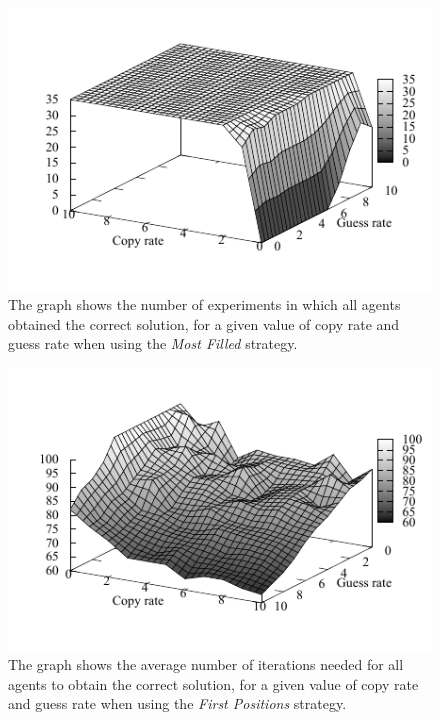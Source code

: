 \documentclass{article}
\begin{document}
\begin{figure}
\includegraphics[scale=1]{ijcai_sudoku/fill_suc}
\caption{The graph shows the number of experiments in which all agents obtained the correct solution, for a given value of copy rate and guess rate when using the \emph{Most Filled} strategy.
}
\label{fig:fill_suc}
\end{figure}

\begin{figure}
\includegraphics[scale=1]{ijcai_sudoku/first_iter}
\caption{The graph shows the average number of iterations needed for all agents to obtain the correct solution, for a given value of copy rate and guess rate when using the \emph{First Positions} strategy.
}
\label{fig:first_iter}
\end{figure}
\end{document}
